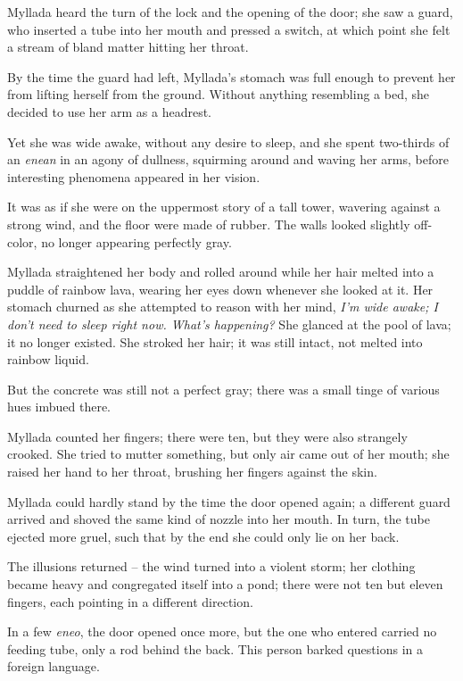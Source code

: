 Myllada heard the turn of the lock and the opening of the door; she saw a guard, who inserted a tube into her mouth and pressed a switch, at which point she felt a stream of bland matter hitting her throat.

By the time the guard had left, Myllada's stomach was full enough to prevent her from lifting herself from the ground. Without anything resembling a bed, she decided to use her arm as a headrest.

Yet she was wide awake, without any desire to sleep, and she spent two-thirds of an \emph{enean} in an agony of dullness, squirming around and waving her arms, before interesting phenomena appeared in her vision.

It was as if she were on the uppermost story of a tall tower, wavering against a strong wind, and the floor were made of rubber. The walls looked slightly off-color, no longer appearing perfectly gray.

Myllada straightened her body and rolled around while her hair melted into a puddle of rainbow lava, wearing her eyes down whenever she looked at it. Her stomach churned as she attempted to reason with her mind, \emph{I'm wide awake; I don't need to sleep right now. What's happening?} She glanced at the pool of lava; it no longer existed. She stroked her hair; it was still intact, not melted into rainbow liquid.

But the concrete was still not a perfect gray; there was a small tinge of various hues imbued there.

Myllada counted her fingers; there were ten, but they were also strangely crooked. She tried to mutter something, but only air came out of her mouth; she raised her hand to her throat, brushing her fingers against the skin.

Myllada could hardly stand by the time the door opened again; a different guard arrived and shoved the same kind of nozzle into her mouth. In turn, the tube ejected more gruel, such that by the end she could only lie on her back.

The illusions returned -- the wind turned into a violent storm; her clothing became heavy and congregated itself into a pond; there were not ten but eleven fingers, each pointing in a different direction.

\centeredstars

In a few \emph{eneo}, the door opened once more, but the one who entered carried no feeding tube, only a rod behind the back. This person barked questions in a foreign language.

